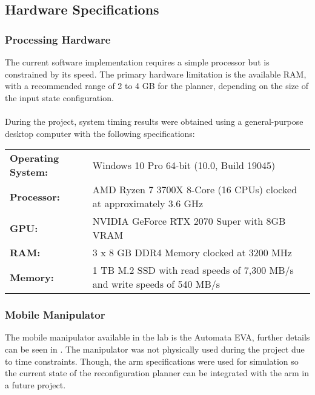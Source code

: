 \subsection{Hardware Specifications}
\subsubsection{Processing Hardware}
The current software implementation requires a simple processor but is constrained by its speed. The primary hardware limitation is the available RAM, with a recommended range of 2 to 4 GB for the planner, depending on the size of the input state configuration.
\\\\
During the project, system timing results were obtained using a general-purpose desktop computer with the following specifications:
\\
\begin{tabularx}{1\textwidth}{ p{} p{} }
	\textbf{Operating System:} 	& Windows 10 Pro 64-bit (10.0, Build 19045)\\
	\textbf{Processor:} 		& AMD Ryzen 7 3700X 8-Core (16 CPUs) clocked at approximately 3.6 GHz\\
	\textbf{GPU:} 				& NVIDIA GeForce RTX 2070 Super with 8GB VRAM\\
	\textbf{RAM:} 				& 3 x 8 GB DDR4 Memory clocked at 3200 MHz\\
	\textbf{Memory:} 			& 1 TB M.2 SSD with read speeds of 7,300 MB/s and write speeds of 540 MB/s\\
\end{tabularx}

\subsubsection{Mobile Manipulator}
The mobile manipulator available in the lab is the Automata EVA, further details can be seen in . The manipulator was not physically used during the project due to time constraints. Though, the arm specifications were used for simulation so the current state of the reconfiguration planner can be integrated with the arm in a future project.